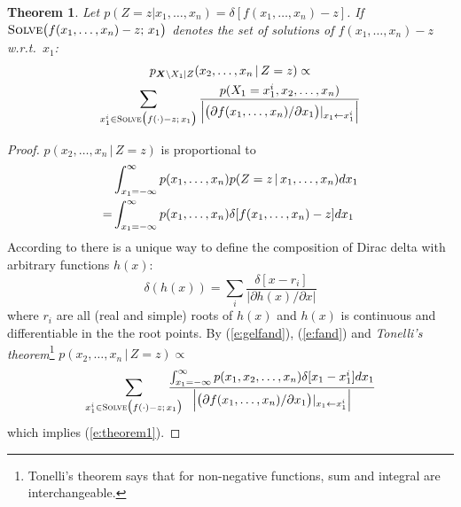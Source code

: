 \documentclass{article}
\newtheorem{theorem}{Theorem}
\newcommand{\pr}{p}
\begin{document}
\begin{theorem} 
\label{theorem1}
Let {\footnotesize $\pr(Z\!=\!z | x_1, \ldots, x_n) = \delta[f(x_1, \ldots, x_n)-z]$}.
If {\footnotesize$\textsc{Solve}\big( f(x_1, \ldots, x_n) - z ; \, x_1 \big)$} denotes the set of solutions of 
$f(x_1, \ldots, x_n)-z$ w.r.t.\ $x_1$:
\begin{multline}
\label{e:theorem1}
p_{\boldsymbol{X}\backslash X_1 | Z}(x_2, \ldots, x_n \,|\, Z=z) \propto \\
\sum_{x_1^i \in \textsc{Solve}\big( f(\cdot) - z ; \, x_1 \big)} 
\frac{p(X_1=x_1^i, x_2, \ldots, x_n)}
{\Big|\big(\partial f(x_1, \ldots, x_n) / \partial x_1 \big)|_{x_1 \leftarrow x_1^i} \Big|}
\end{multline}
\end{theorem}
\begin{proof}
$p(x_2, \ldots, x_n \,|\, Z=z)$ is proportional to
\begin{align}
%
%
%
&\int_{x_1=-\infty}^{\infty}p(x_1, \ldots, x_n)p(Z=z \,|\, x_1, \ldots, x_n) dx_1 \notag\\
%
=&\int_{x_1=-\infty}^{\infty}p(x_1, \ldots, x_n)
\delta[f(x_1, \ldots, x_n) - z] dx_1 
\label{e:fand}
\end{align}
According to \cite{gel1964generalized}
there is a unique way to define the composition of Dirac delta with 
arbitrary functions $h(x)$:
\begin{equation}
\label{e:gelfand}
\delta(h(x)) = \sum_{i} \frac{\delta[x - r_i]}{|\partial h(x)/\partial x|}
\end{equation}
where $r_i$ are all (real and simple) roots of $h(x)$ and $h(x)$ is continuous and differentiable in the the root points. By (\ref{e:gelfand}), (\ref{e:fand}) and 
\emph{Tonelli's theorem}\footnote{Tonelli's theorem says that for non-negative functions, sum and integral are interchangeable.} 
$\pr(x_2, \ldots, x_n \,|\, Z = z) \propto$
\begin{equation*}
\sum_{x_1^i \in \textsc{Solve}\big( f(\cdot) - z ; \, x_1 \big)} \!\!\!\!\!\!\!\!
\frac{\int_{x_1 = -\infty}^{\infty} p(x_1, x_2, \ldots, x_n)  \delta[x_1 - x_1^i] d x_1}
{\Big|\big(\partial f(x_1, \ldots, x_n) / \partial x_1 \big)|_{x_1 \leftarrow x_1^i} \Big|}
\end{equation*}
which implies (\ref{e:theorem1}).
\end{proof}
\end{document}
